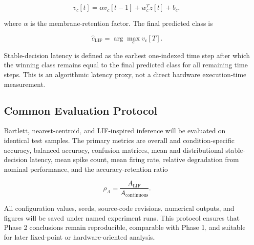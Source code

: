 \[
v_c[t]
=
\alpha v_c[t-1]
+
w_c^{T}z[t]
+
b_c,
\]

where $\alpha$ is the membrane-retention factor. The final predicted class is

\[
\widehat{c}_{\mathrm{LIF}}
=
\arg\max_c v_c[T].
\]

Stable-decision latency is defined as the earliest one-indexed time step after which the winning class remains equal to the final predicted class for all remaining time steps. This is an algorithmic latency proxy, not a direct hardware execution-time measurement.

\subsection{Common Evaluation Protocol}

Bartlett, nearest-centroid, and LIF-inspired inference will be evaluated on identical test samples. The primary metrics are overall and condition-specific accuracy, balanced accuracy, confusion matrices, mean and distributional stable-decision latency, mean spike count, mean firing rate, relative degradation from nominal performance, and the accuracy-retention ratio

\[
\rho_A
=
\frac{A_{\mathrm{LIF}}}{A_{\mathrm{continuous}}}.
\]

All configuration values, seeds, source-code revisions, numerical outputs, and figures will be saved under named experiment runs. This protocol ensures that Phase 2 conclusions remain reproducible, comparable with Phase 1, and suitable for later fixed-point or hardware-oriented analysis.